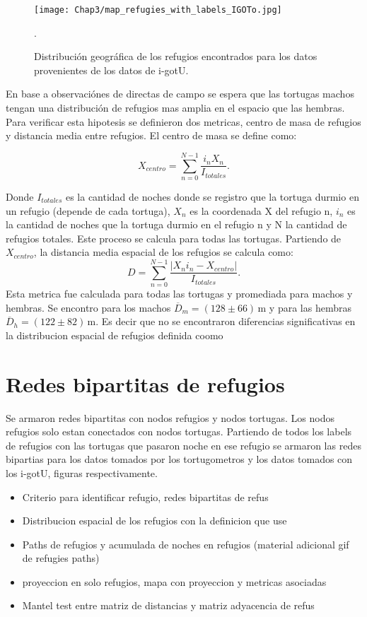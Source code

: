 \begin{figure}[ht]
    \begin{center}
        \texttt{[image: Chap3/map\_refugies\_with\_labels\_IGOTo.jpg]}
        \caption{Distribución geográfica de los refugios encontrados para los datos provenientes de los datos de i-gotU.} 
        \label{fig:refus_igotu_labels}.
        
        \end{center}
\end{figure} 

En base a observaciónes de directas de campo \cite{Erika} se espera que las tortugas machos tengan una distribución de refugios mas amplia en el espacio que las hembras.  Para verificar esta hipotesis se definieron dos metricas, centro de masa de refugios y distancia media entre refugios. El centro de masa se define como:
\begin{center}
    

$$X_{centro}= \sum^{N -1}_{n=0} \frac{i_{n} X_n}{I_{totales}}.$$
\end{center}
Donde $I_{totales}$ es la cantidad de noches donde se registro que la tortuga durmio en un refugio (depende de cada tortuga), $X_n$ es la coordenada X del refugio n, $i_{n}$ es la cantidad de noches que la tortuga durmio en el refugio n y N la cantidad de refugios totales.  Este proceso se calcula para todas las tortugas. 
Partiendo de $X_{centro}$, la distancia media  espacial de los refugios se calcula como:
$$D = \sum^{N -1}_{n=0} \frac{|X_n i_n - X_{centro}|}{I_{totales}}.$$
Esta metrica fue calculada para todas las tortugas y  promediada para  machos y hembras. Se encontro para los machos $\overline{D}_m =  (128\pm66)\,\text{m}$ y para las hembras     $\overline{D}_h = (122\pm82)\,\text{m}$. Es decir que no se encontraron diferencias significativas en la distribucion espacial de refugios definida coomo
\section{Redes bipartitas de refugios}
Se armaron redes bipartitas con nodos refugios y nodos tortugas. Los nodos refugios solo estan conectados con nodos tortugas.  Partiendo de todos los labels de refugios con las tortugas que pasaron noche en ese refugio se armaron las redes bipartias para los datos tomados por los tortugometros y los datos tomados con los i-gotU, figuras respectivamente.%

\begin{itemize}
    \item Criterio para identificar refugio, redes bipartitas de refus
    \item Distribucion espacial de los refugios con la definicion que use
    \item Paths de refugios y acumulada de noches en refugios (material adicional gif de refugies paths)
    \item proyeccion en solo refugios, mapa con proyeccion y metricas asociadas 
    \item Mantel test entre matriz de distancias y matriz adyacencia de refus 
\end{itemize}

